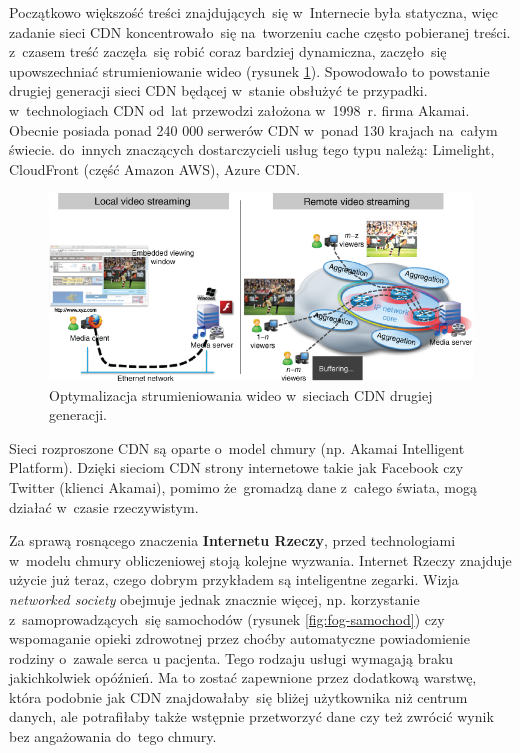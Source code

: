 \documentclass[12pt,a4paper,twoside,titlepage,openright]{book}
\begin{document}
Początkowo większość treści znajdujących~się w~Internecie była statyczna, więc zadanie sieci CDN koncentrowało~się na~tworzeniu cache często pobieranej treści. z~czasem treść zaczęła~się robić coraz bardziej dynamiczna, zaczęło~się upowszechniać strumieniowanie wideo (rysunek \ref{fig:cdn-streaming}). Spowodowało to powstanie drugiej generacji sieci CDN będącej w~stanie obsłużyć te przypadki. w~technologiach CDN od~lat przewodzi założona w~1998~r. firma Akamai. Obecnie posiada ponad 240 000 serwerów CDN w~ponad 130 krajach na~całym świecie.\cite{siteAkamaiFacts} do~innych znaczących dostarczycieli usług tego typu należą: Limelight, CloudFront (część Amazon AWS), Azure CDN. \cite{ccCambridge, cdn}

\begin{figure}[h]
	\centering
			\includegraphics[resolution=120]{cdn-streaming.jpg}
		\caption{Optymalizacja strumieniowania wideo w~sieciach CDN drugiej generacji. \cite{cdn}}
		\label{fig:cdn-streaming}
\end{figure}


Sieci rozproszone CDN są oparte o~model chmury (np. Akamai Intelligent Platform). Dzięki sieciom CDN strony internetowe takie jak Facebook czy Twitter (klienci Akamai), pomimo że~gromadzą dane z~całego świata, mogą działać w~czasie rzeczywistym. \cite{ccCambridge}

Za sprawą rosnącego znaczenia \textbf{Internetu Rzeczy}, przed technologiami w~modelu chmury obliczeniowej stoją kolejne wyzwania. Internet Rzeczy znajduje użycie już teraz, czego dobrym przykładem są inteligentne zegarki. Wizja \textit{networked society} obejmuje jednak znacznie więcej, np. korzystanie z~samoprowadzących~się samochodów (rysunek \ref{fig:fog-samochod}) czy wspomaganie opieki zdrowotnej przez choćby automatyczne powiadomienie rodziny o~zawale serca u pacjenta. Tego rodzaju usługi wymagają braku jakichkolwiek opóźnień. Ma to zostać zapewnione przez dodatkową warstwę, która podobnie jak CDN znajdowałaby~się bliżej użytkownika niż centrum danych, ale potrafiłaby także wstępnie przetworzyć dane czy też zwrócić wynik bez angażowania do~tego chmury.
\end{document}
